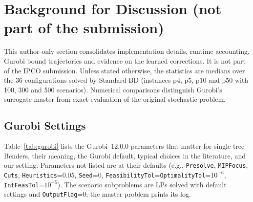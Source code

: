 \clearpage
\section{Background for Discussion (not part of the submission)}\label{app:meeting}

This author-only section consolidates implementation details, runtime accounting, Gurobi bound trajectories and evidence on the learned corrections. It is not part of the IPCO submission. Unless stated otherwise, the statistics are medians over the 36 configurations solved by Standard BD (instances p4, p5, p10 and p50 with 100, 300 and 500 scenarios). Numerical comparisons distinguish Gurobi's surrogate master from exact evaluation of the original stochastic problem.

\subsection{Gurobi Settings}\label{app:gurobi}

Table~\ref{tab:gurobi} lists the Gurobi~12.0.0 parameters that matter for single-tree Benders, their meaning, the Gurobi default, typical choices in the literature, and our setting. Parameters not listed are at their defaults (e.g., \texttt{Presolve}, \texttt{MIPFocus}, \texttt{Cuts}, \texttt{Heuristics}=0.05, \texttt{Seed}=0, \texttt{FeasibilityTol}=\texttt{OptimalityTol}=$10^{-6}$, \texttt{IntFeasTol}=$10^{-5}$). The scenario subproblems are LPs solved with default settings and \texttt{OutputFlag}=0; the master problem prints its log.


